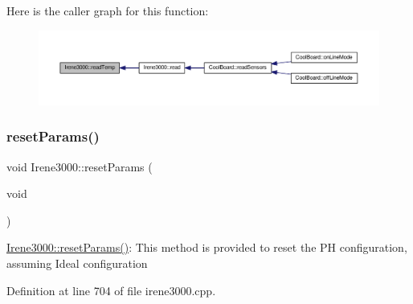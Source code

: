 Here is the caller graph for this function\+:\nopagebreak
\begin{figure}[H]
\begin{center}
\leavevmode
\includegraphics[width=350pt]{d6/d03/class_irene3000_a80bc6dfea106dc3bc54fa20204d4d5dc_icgraph}
\end{center}
\end{figure}
\mbox{\label{class_irene3000_a43b0e44f8d211413ff4e3a0c654205ff}} 
\subsubsection{\texorpdfstring{reset\+Params()}{resetParams()}}
{\footnotesize\ttfamily void Irene3000\+::reset\+Params (\begin{DoxyParamCaption}\item[{void}]{ }\end{DoxyParamCaption})}

\hyperlink{class_irene3000_a43b0e44f8d211413ff4e3a0c654205ff}{Irene3000\+::reset\+Params()}\+: This method is provided to reset the PH configuration, assuming Ideal configuration 

Definition at line 704 of file irene3000.\+cpp.


